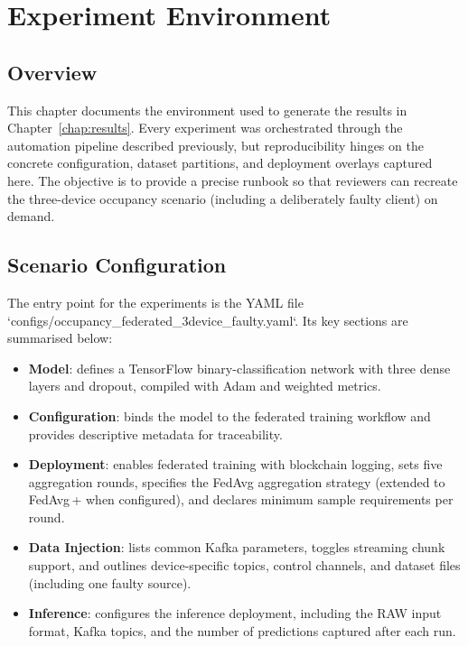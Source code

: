 \chapter{Experiment Environment}

\section{Overview}

This chapter documents the environment used to generate the results in Chapter~\ref{chap:results}. Every experiment was orchestrated through the automation pipeline described previously, but reproducibility hinges on the concrete configuration, dataset partitions, and deployment overlays captured here. The objective is to provide a precise runbook so that reviewers can recreate the three-device occupancy scenario (including a deliberately faulty client) on demand.

\section{Scenario Configuration}
\label{sec:scenario_config}

The entry point for the experiments is the YAML file `configs/occupancy_federated_3device_faulty.yaml`. Its key sections are summarised below:

\begin{itemize}
    \item \textbf{Model}: defines a TensorFlow binary-classification network with three dense layers and dropout, compiled with Adam and weighted metrics.
    \item \textbf{Configuration}: binds the model to the federated training workflow and provides descriptive metadata for traceability.
    \item \textbf{Deployment}: enables federated training with blockchain logging, sets five aggregation rounds, specifies the FedAvg aggregation strategy (extended to FedAvg\,+ when configured), and declares minimum sample requirements per round.
    \item \textbf{Data Injection}: lists common Kafka parameters, toggles streaming chunk support, and outlines device-specific topics, control channels, and dataset files (including one faulty source).
    \item \textbf{Inference}: configures the inference deployment, including the RAW input format, Kafka topics, and the number of predictions captured after each run.
\end{itemize}

